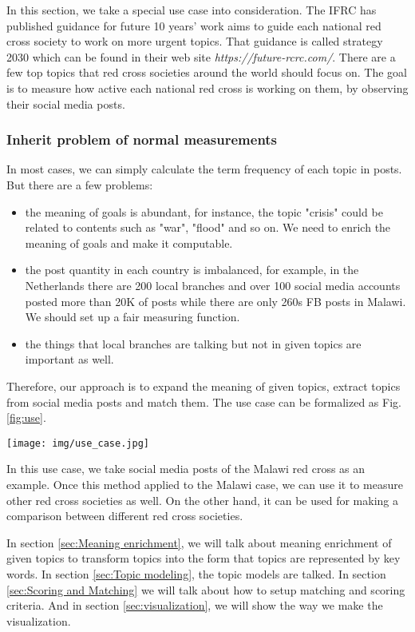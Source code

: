 \documentclass[sigchi]{acmart}
\begin{document}
In this section, we take a special use case into consideration. The IFRC has published guidance for future 10 years' work aims to guide each national red cross society to work on more urgent topics. That guidance is called strategy 2030 which can be found in their web site \textit{https://future-rcrc.com/}. There are a few top topics that red cross societies around the world should focus on. The goal is to measure how active each national red cross is working on them, by observing their social media posts. 

\subsubsection{Inherit problem of normal measurements}
In most cases, we can simply calculate the term frequency of each topic in posts. But there are a few problems:
\begin{itemize}
    \item the meaning of goals is abundant, for instance, the topic "crisis" could be related to contents such as "war", "flood" and so on. We need to enrich the meaning of goals and make it computable.
    \item the post quantity in each country is imbalanced, for example, in the Netherlands there are 200 local branches and over 100 social media accounts posted more than 20K of posts while there are only 260s FB posts in Malawi. We should set up a fair measuring function.
    \item the things that local branches are talking but not in given topics are important as well.
\end{itemize}

Therefore, our approach is to expand the meaning of given topics, extract topics from social media posts and match them. The use case can be formalized as Fig.\ref{fig:use}.
\begin{figure*}
    \texttt{[image: img/use\_case.jpg]}
    \caption{Example of measuring red cross societies(Malawi)}
    \label{fig:use}
\end{figure*}

In this use case, we take social media posts of the Malawi red cross as an example. Once this method applied to the Malawi case, we can use it to measure other red cross societies as well. On the other hand, it can be used for making a comparison between different red cross societies.


In section \ref{sec:Meaning enrichment}, we will talk about meaning enrichment of given topics to transform topics into the form that topics are represented by key words. In section \ref{sec:Topic modeling}, the topic models are talked. In section \ref{sec:Scoring and Matching} we will talk about how to setup matching and scoring criteria. And in section \ref{sec:visualization}, we will show the way we make the visualization.
\end{document}
